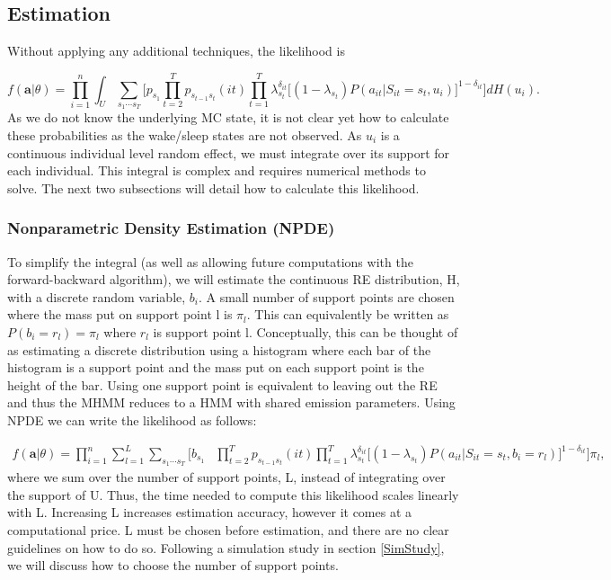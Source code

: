 \documentclass{article}
\begin{document}
\subsection{Estimation}

Without applying any additional techniques, the likelihood is 

\begin{equation*}
f(\textbf{a}|\theta) = \prod_{i=1}^n \int_U \sum_{{s_1}\cdots{s_T}} \biggr[ 
    p_{s_1} \prod_{t=2}^T p_{s_{t-1}s_t}(it) \prod_{t=1}^T \lambda_{s_t}^{\delta_{it}} \big[(1-\lambda_{s_t})P(a_{it}|S_{it}=s_t,u_i)\big]^{1-\delta_{it}}\biggr] dH(u_i).
\end{equation*}
As we do not know the underlying MC state, it is not clear yet how to calculate these probabilities as the wake/sleep states are not observed. As $u_i$ is a continuous individual level random effect, we must integrate over its support for each individual. This integral is complex and requires numerical methods to solve. The next two subsections will detail how to calculate this likelihood. 



\subsubsection{Nonparametric Density Estimation (NPDE)}

To simplify the integral (as well as allowing future computations with the forward-backward algorithm), we will estimate the continuous RE distribution, H, with a discrete random variable, $b_i$. A small number of support points are chosen where the mass put on support point l is $\pi_l$. This can equivalently be written as $P(b_i = r_l) = \pi_l$ where $r_l$ is support point l. Conceptually, this can be thought of as estimating a discrete distribution using a histogram where each bar of the histogram is a support point and the mass put on each support point is the height of the bar. Using one support point is equivalent to leaving out the RE and thus the MHMM reduces to a HMM with shared emission parameters. Using NPDE we can write the likelihood as follows: 

\begin{equation*}\label{like2}
    \begin{split}
f(\textbf{a}|\theta) = \prod_{i=1}^n \sum_{l=1}^L \sum_{{s_1}\cdots{s_T}} \biggr[ 
    b_{s_1} & \prod_{t=2}^T p_{s_{t-1}s_t}(it) 
    \prod_{t=1}^T \lambda_{s_t}^{\delta_{it}} \big[(1-\lambda_{s_t})P(a_{it}|S_{it}=s_t,b_i=r_l)\big]^{1-\delta_{it}} \biggr] \pi_l,
    \end{split}
\end{equation*}
where we sum over the number of support points, L, instead of integrating over the support of U. Thus, the time needed to compute this likelihood scales linearly with L. Increasing L increases estimation accuracy, however it comes at a computational price. L must be chosen before estimation, and there are no clear guidelines on how to do so. Following a simulation study in section \ref{SimStudy}, we will discuss how to choose the number of support points.
\end{document}
